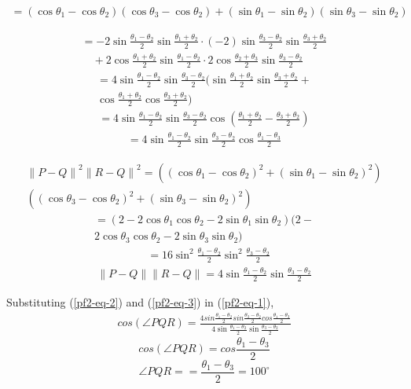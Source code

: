 \documentclass[journal,10pt,twocolumn]{article}
\providecommand{\norm}[1]{\left\lVert#1\right\rVert}
\begin{document}
{{{\begin{multline*}
 = (\cos\theta_1-\cos\theta_2)(\cos\theta_3-\cos\theta_2)+(\sin\theta_1-\sin\theta_2)(\sin\theta_3-\sin\theta_2)
\end{multline*}

\begin{multline*}
 = -2\sin\frac{\theta_1-\theta_2}2\sin\frac{\theta_1+\theta_2}2 \cdot(-2)\sin\frac{\theta_3-\theta_2}2\sin\frac{\theta_3+\theta_2}2 \\\quad+ 2\cos\frac{\theta_1+\theta_2}2\sin\frac{\theta_1-\theta_2}2 \cdot 2\cos\frac{\theta_2+\theta_3}2\sin\frac{\theta_3-\theta_2}2
\end{multline*}
\begin{multline*}
 = 4\sin\frac{\theta_1-\theta_2}2\sin\frac{\theta_3-\theta_2}2(\sin\frac{\theta_1+\theta_2}2\sin\frac{\theta_3+\theta_2}2+\\
 \cos\frac{\theta_1+\theta_2}2\cos\frac{\theta_3+\theta_2}2)
\end{multline*}
\begin{align*}
 = 4\sin\frac{\theta_1-\theta_2}2\sin\frac{\theta_3-\theta_2}2\cos\left(\frac{\theta_1+\theta_2}2-\frac{\theta_3+\theta_2}2\right)
\end{align*}
\begin{align}
 = 4\sin\frac{\theta_1-\theta_2}2\sin\frac{\theta_3-\theta_2}2\cos\frac{\theta_1-\theta_3}2
 \label{pf2-eq-2}
\end{align}

\begin{multline*}
 \norm{P-Q}^2\norm{R-Q}^2 = ((\cos\theta_1-\cos\theta_2)^2+(\sin\theta_1-\sin\theta_2)^2)\\
 ((\cos\theta_3-\cos\theta_2)^2+(\sin\theta_3-\sin\theta_2)^2)
\end{multline*}
\begin{multline*}
 = (2-2\cos\theta_1\cos\theta_2 - 2\sin\theta_1\sin\theta_2)(2-\\
 2\cos\theta_3\cos\theta_2 - 2\sin\theta_3\sin\theta_2)
\end{multline*}
\begin{align*}
 &= 16 \sin^2\frac{\theta_1-\theta_2}2\sin^2\frac{\theta_3-\theta_2}2
\end{align*}
\begin{align}
 \norm{P-Q}\norm{R-Q} = 4 \sin\frac{\theta_1-\theta_2}2\sin\frac{\theta_3-\theta_2}2
 \label{pf2-eq-3}
\end{align}

Substituting (\ref{pf2-eq-2}) and (\ref{pf2-eq-3}) in (\ref{pf2-eq-1}),
\begin{multline*}
 cos(\angle PQR) = \frac{4sin\frac{\theta_1-\theta_2}{2}sin\frac{\theta_3-\theta_2}{2}cos\frac{\theta_1-\theta_3}{2}}{4 \sin\frac{\theta_1-\theta_2}2\sin\frac{\theta_3-\theta_2}2}
\end{multline*}
\begin{equation}
cos(\angle PQR) = cos\frac{\theta_1-\theta_3}{2}
\label{pf2-eq-4}
\end{equation}
\begin{equation*}
\angle PQR = =\frac{\theta_1 - \theta_3 }{2}=100^\circ
\end{equation*}


}}}
\end{document}
